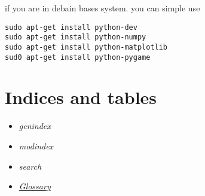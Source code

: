 \documentclass[letterpaper,10pt,english]{sphinxmanual}
\begin{document}
if you are in debain bases system. you can simple use

\begin{Verbatim}[commandchars=\\\{\}]
sudo apt-get install python-dev
sudo apt-get install python-numpy
sudo apt-get install python-matplotlib
sud0 apt-get install python-pygame
\end{Verbatim}


\chapter{Indices and tables}
\label{index:indices-and-tables}\begin{itemize}
\item {} 
\emph{genindex}

\item {} 
\emph{modindex}

\item {} 
\emph{search}

\item {} 
\href{http://docs.python.org/glossary.html\#glossary}{\emph{Glossary}}

\end{itemize}



\renewcommand{\indexname}{Index}
\printindex
\end{document}
